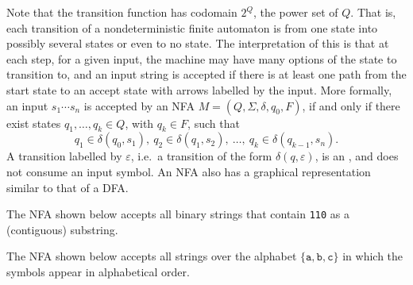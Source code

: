 Note that the transition function has codomain $2^Q$, the power set of $Q$. That is, each transition of a nondeterministic finite automaton is from one state into possibly several states or even to no state. The interpretation of this is that at each step, for a given input, the machine may have many options of the state to transition to, and an input string is accepted if there is at least one path from the start state to an accept state with arrows labelled by the input. More formally, an input $s_1 \cdots s_n$ is accepted by an NFA $M = (Q, \Sigma, \delta, q_0, F)$, if and only if there exist states $q_1, \ldots, q_k \in Q$, with $q_k \in F$, such that
\begin{equation*}
q_1 \in \delta(q_0, s_1),~ q_2 \in \delta(q_1, s_2),~ \ldots,~ q_k \in \delta(q_{k-1}, s_n).
\end{equation*}
A transition labelled by $\varepsilon$, i.e.\ a transition of the form $\delta(q, \varepsilon)$, is an , and does not consume an input symbol. An NFA also has a graphical representation similar to that of a DFA.

\begin{Example}\label{ex:NFAContains110}
The NFA shown below accepts all binary strings that contain \texttt{110} as a (contiguous) substring.
\begin{center}
\end{center}
\end{Example}

\begin{Example}\label{ex:NFAabcAlphabetical}
The NFA shown below accepts all strings over the alphabet $\{\texttt a, \texttt b, \texttt c\}$ in which the symbols appear in alphabetical order.
\begin{center}
\end{center}
\end{Example}


